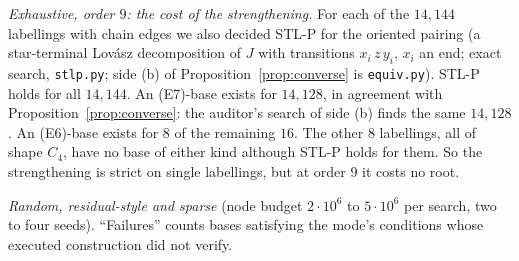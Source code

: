 \documentclass[11pt]{amsart}
\theoremstyle{definition}
\begin{document}
\emph{Exhaustive, order $9$: the cost of the strengthening.} For each of the $14{,}144$
labellings with chain edges we also decided STL-P for the oriented pairing (a star-terminal
Lov\'asz decomposition of $J$ with transitions $x_i\,z\,y_i$, $x_i$ an end; exact search,
\texttt{stlp.py}; side (b) of Proposition~\ref{prop:converse} is \texttt{equiv.py}).
STL-P holds for all $14{,}144$. An (E7)-base exists for $14{,}128$, in agreement with
Proposition~\ref{prop:converse}: the auditor's search of side (b) finds the same $14{,}128$. An
(E6)-base exists for $8$ of the remaining $16$. The other $8$ labellings, all of shape $C_4$,
have no base of either kind although STL-P holds for them. So the strengthening is strict on
single labellings, but at order $9$ it costs no root.

\emph{Random, residual-style and sparse} (node budget $2\cdot10^6$ to $5\cdot10^6$ per search,
two to four seeds). ``Failures'' counts bases satisfying the mode's conditions whose executed
construction did not verify.
\end{document}
